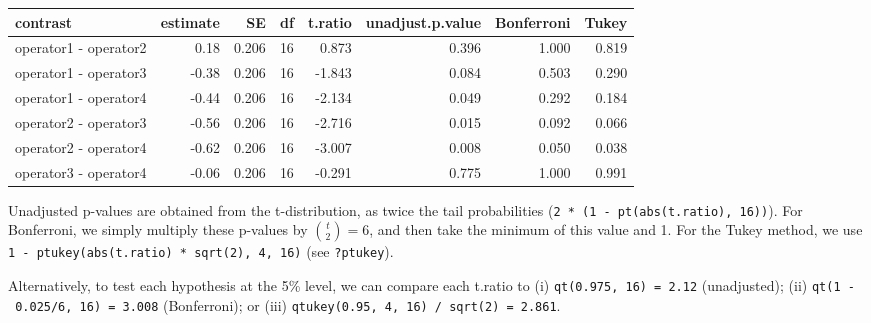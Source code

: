 \documentclass[
]{book}
\theoremstyle{definition}
\theoremstyle{definition}
\theoremstyle{definition}
\theoremstyle{definition}
\theoremstyle{remark}
\begin{document}
\begin{tabular}{l|r|r|r|r|r|r|r}
\hline
contrast & estimate & SE & df & t.ratio & unadjust.p.value & Bonferroni & Tukey\\
\hline
operator1 - operator2 & 0.18 & 0.206 & 16 & 0.873 & 0.396 & 1.000 & 0.819\\
\hline
operator1 - operator3 & -0.38 & 0.206 & 16 & -1.843 & 0.084 & 0.503 & 0.290\\
\hline
operator1 - operator4 & -0.44 & 0.206 & 16 & -2.134 & 0.049 & 0.292 & 0.184\\
\hline
operator2 - operator3 & -0.56 & 0.206 & 16 & -2.716 & 0.015 & 0.092 & 0.066\\
\hline
operator2 - operator4 & -0.62 & 0.206 & 16 & -3.007 & 0.008 & 0.050 & 0.038\\
\hline
operator3 - operator4 & -0.06 & 0.206 & 16 & -0.291 & 0.775 & 1.000 & 0.991\\
\hline
\end{tabular}

Unadjusted p-values are obtained from the t-distribution, as twice the tail probabilities (\texttt{2\ *\ (1\ -\ pt(abs(t.ratio),\ 16))}). For Bonferroni, we simply multiply these p-values by \({t \choose 2} = 6\), and then take the minimum of this value and 1. For the Tukey method, we use \texttt{1\ -\ ptukey(abs(t.ratio)\ *\ sqrt(2),\ 4,\ 16)} (see \texttt{?ptukey}).

Alternatively, to test each hypothesis at the 5\% level, we can compare each t.ratio to (i) \texttt{qt(0.975,\ 16)\ =\ 2.12} (unadjusted); (ii) \texttt{qt(1\ -\ 0.025/6,\ 16)\ =\ 3.008} (Bonferroni); or (iii) \texttt{qtukey(0.95,\ 4,\ 16)\ /\ sqrt(2)\ =\ 2.861}.
\end{document}
